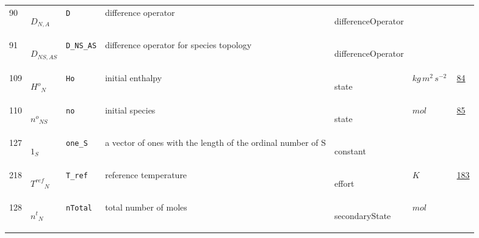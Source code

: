 \begin{longtable}{|p{1cm}|p{2.5cm}|p{4.5cm}|p{8cm}|p{3.0cm}|p{3cm}|p{1cm}|}
            90
             & \hypertarget{"v:90"}{ $ {D}{_{N, A}} $}
             & \verb|D|
             & difference operator
             & \begin{lay}differenceOperator \end{lay}
             & $  $
             & \\
            91
             & \hypertarget{"v:91"}{ $ {D}{_{{N S}, {A S}}} $}
             & \verb|D_NS_AS|
             & difference operator for species topology
             & \begin{lay}differenceOperator \end{lay}
             & $  $
             & \\
            109
             & \hypertarget{"v:109"}{ $ {{H^o}}{_{N}} $}
             & \verb|Ho|
             & initial enthalpy
             & \begin{lay}state \end{lay}
             & $ kg \,m^{2} \,s^{-2} \, $
             &                 \hyperlink{"e:84"}{ 84 }
                 \\
            110
             & \hypertarget{"v:110"}{ $ {{n^o}}{_{{N S}}} $}
             & \verb|no|
             & initial species
             & \begin{lay}state \end{lay}
             & $ mol \, $
             &                 \hyperlink{"e:85"}{ 85 }
                 \\
            127
             & \hypertarget{"v:127"}{ $ {{1}}{_{S}} $}
             & \verb|one_S|
             & a vector of ones with the length of the ordinal number of S
             & \begin{lay}constant \end{lay}
             & $  $
             & \\
            218
             & \hypertarget{"v:218"}{ $ {{T^{ref}}}{_{N}} $}
             & \verb|T_ref|
             & reference temperature
             & \begin{lay}effort \end{lay}
             & $ K \, $
             &                 \hyperlink{"e:183"}{ 183 }
                 \\
            128
             & \hypertarget{"v:128"}{ $ {{n^t}}{_{N}} $}
             & \verb|nTotal|
             & total number of moles
             & \begin{lay}secondaryState \end{lay}
             & $ mol \, $

\end{longtable}
